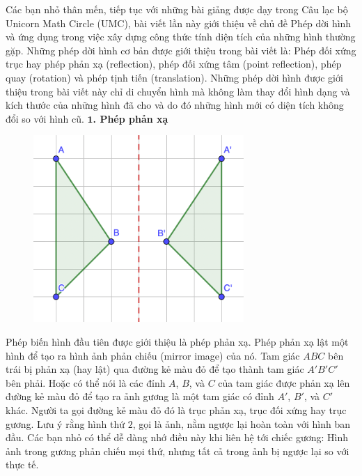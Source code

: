 \begin{multicols}{2}
	Các bạn nhỏ thân mến, tiếp tục với những bài giảng được dạy trong Câu lạc bộ Unicorn Math Circle (UMC), bài viết lần này giới thiệu về chủ đề Phép dời hình và ứng dụng trong việc xây dựng công thức tính diện tích của những hình thường gặp. Những phép dời hình cơ bản được giới thiệu trong bài viết là: Phép đối xứng trục hay phép phản xạ (reflection), phép đối xứng tâm (point reflection), phép quay (rotation) và phép tịnh tiến (translation).
	\vskip 0.1cm
	Những phép dời hình được giới thiệu trong bài viết này chỉ di chuyển hình mà không làm thay đổi hình dạng và kích thước của những hình đã cho và do đó những hình mới có diện tích không đổi so với hình cũ.
	\vskip 0.1cm
	\textbf{\color{toancuabi}$\pmb1$. Phép phản xạ}
	\begin{figure}[H]
		\vspace*{-10pt}
		\centering
		\captionsetup{labelformat= empty, justification=centering}
		\includegraphics[width= 0.65\linewidth]{Picture1}
		\vspace*{-10pt}
	\end{figure}
	Phép biến hình đầu tiên được giới thiệu là phép phản xạ. Phép phản xạ lật một hình để tạo ra hình ảnh phản chiếu (mirror image) của nó.
	\vskip 0.1cm
	Tam giác $ABC$ bên trái bị phản xạ (hay lật) qua đường kẻ màu đỏ để tạo thành tam giác $A'B'C'$ bên phải. Hoặc có thể nói là các đỉnh $A$, $B$, và $C$ của tam giác được phản xạ lên đường kẻ màu đỏ để tạo ra ảnh gương là       một tam giác có đỉnh $A'$, $B'$, và $C'$ khác. Người ta gọi đường kẻ màu đỏ đó là trục phản xạ, trục đối xứng hay trục gương. Lưu ý rằng hình thứ $2$, gọi là ảnh, nằm ngược lại hoàn toàn với hình ban đầu. Các bạn nhỏ có thể dễ dàng nhớ điều này khi liên hệ tới chiếc gương: Hình ảnh trong gương phản chiếu mọi thứ, nhưng tất cả trong ảnh bị ngược lại so với thực tế.

\end{multicols}
